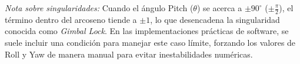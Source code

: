 \textit{Nota sobre singularidades:} Cuando el ángulo Pitch ($\theta$) se acerca a $\pm 90^\circ$ ($\pm \frac{\pi}{2}$), el término dentro del arcoseno tiende a $\pm 1$, lo que desencadena la singularidad conocida como \textit{Gimbal Lock}. En las implementaciones prácticas de software, se suele incluir una condición para manejar este caso límite, forzando los valores de Roll y Yaw de manera manual para evitar inestabilidades numéricas.

